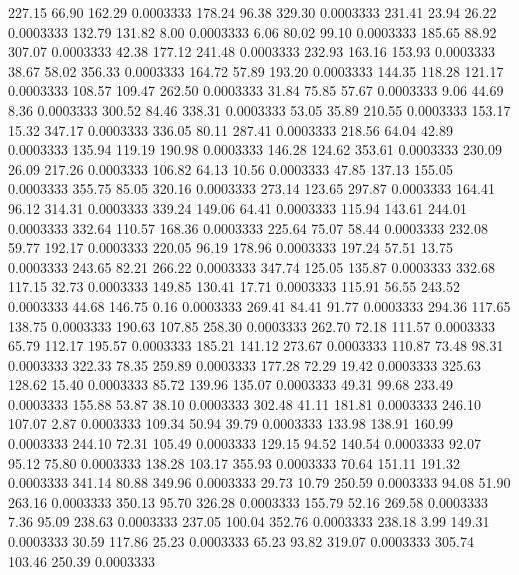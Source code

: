  227.15   66.90  162.29   0.0003333
 178.24   96.38  329.30   0.0003333
 231.41   23.94   26.22   0.0003333
 132.79  131.82    8.00   0.0003333
   6.06   80.02   99.10   0.0003333
 185.65   88.92  307.07   0.0003333
  42.38  177.12  241.48   0.0003333
 232.93  163.16  153.93   0.0003333
  38.67   58.02  356.33   0.0003333
 164.72   57.89  193.20   0.0003333
 144.35  118.28  121.17   0.0003333
 108.57  109.47  262.50   0.0003333
  31.84   75.85   57.67   0.0003333
   9.06   44.69    8.36   0.0003333
 300.52   84.46  338.31   0.0003333
  53.05   35.89  210.55   0.0003333
 153.17   15.32  347.17   0.0003333
 336.05   80.11  287.41   0.0003333
 218.56   64.04   42.89   0.0003333
 135.94  119.19  190.98   0.0003333
 146.28  124.62  353.61   0.0003333
 230.09   26.09  217.26   0.0003333
 106.82   64.13   10.56   0.0003333
  47.85  137.13  155.05   0.0003333
 355.75   85.05  320.16   0.0003333
 273.14  123.65  297.87   0.0003333
 164.41   96.12  314.31   0.0003333
 339.24  149.06   64.41   0.0003333
 115.94  143.61  244.01   0.0003333
 332.64  110.57  168.36   0.0003333
 225.64   75.07   58.44   0.0003333
 232.08   59.77  192.17   0.0003333
 220.05   96.19  178.96   0.0003333
 197.24   57.51   13.75   0.0003333
 243.65   82.21  266.22   0.0003333
 347.74  125.05  135.87   0.0003333
 332.68  117.15   32.73   0.0003333
 149.85  130.41   17.71   0.0003333
 115.91   56.55  243.52   0.0003333
  44.68  146.75    0.16   0.0003333
 269.41   84.41   91.77   0.0003333
 294.36  117.65  138.75   0.0003333
 190.63  107.85  258.30   0.0003333
 262.70   72.18  111.57   0.0003333
  65.79  112.17  195.57   0.0003333
 185.21  141.12  273.67   0.0003333
 110.87   73.48   98.31   0.0003333
 322.33   78.35  259.89   0.0003333
 177.28   72.29   19.42   0.0003333
 325.63  128.62   15.40   0.0003333
  85.72  139.96  135.07   0.0003333
  49.31   99.68  233.49   0.0003333
 155.88   53.87   38.10   0.0003333
 302.48   41.11  181.81   0.0003333
 246.10  107.07    2.87   0.0003333
 109.34   50.94   39.79   0.0003333
 133.98  138.91  160.99   0.0003333
 244.10   72.31  105.49   0.0003333
 129.15   94.52  140.54   0.0003333
  92.07   95.12   75.80   0.0003333
 138.28  103.17  355.93   0.0003333
  70.64  151.11  191.32   0.0003333
 341.14   80.88  349.96   0.0003333
  29.73   10.79  250.59   0.0003333
  94.08   51.90  263.16   0.0003333
 350.13   95.70  326.28   0.0003333
 155.79   52.16  269.58   0.0003333
   7.36   95.09  238.63   0.0003333
 237.05  100.04  352.76   0.0003333
 238.18    3.99  149.31   0.0003333
  30.59  117.86   25.23   0.0003333
  65.23   93.82  319.07   0.0003333
 305.74  103.46  250.39   0.0003333
